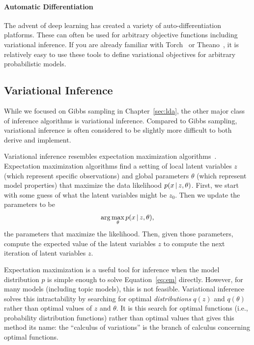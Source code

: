 \paragraph{Automatic Differentiation}

The advent of deep learning has created a variety of
auto-differentiation platforms.  These can often be used for arbitrary
objective functions including variational inference.  If you are
already familiar with Torch~\citep{collobert-11} or Theano~\citep{theano}, it is relatively easy to use
these tools to define variational objectives for arbitrary
probabilistic models.

\subsection{Variational Inference}

While we focused on Gibbs sampling in Chapter~\ref{sec:lda}, the other major
class of inference algorithms is variational inference.  Compared to
Gibbs sampling, variational inference is often considered to be
slightly more difficult to both derive and implement.

Variational inference resembles expectation maximization
algorithms~\citep{liang-07b}.  Expectation maximization algorithms find a
setting of local latent variables $z$ (which represent specific observations) and global parameters $\theta$ (which represent model properties) that maximize
the data likelihood $p(x \, | \, z, \theta)$.  First, we start with some guess
of what the latent variables might be $z_0$.  Then we update the
parameters to be
\begin{equation}
  \arg \max_{\theta} p(x \, | \, z, \theta),
\label{eq:em}
\end{equation}
the parameters that maximize the likelihood.  Then, given those
parameters, compute the expected value of the latent variables $z$ to
compute the next iteration of latent variables $z$.

Expectation maximization is a useful tool for inference when the model
distribution $p$ is simple enough to solve Equation~\ref{eq:em}
directly.  However, for many models (including topic models), this is
not feasible.  Variational inference solves this intractability by
searching for optimal {\em distributions} $q(z)$ and $q(\theta)$ rather than optimal values of $z$ and $\theta$.
It is this search for optimal functions (i.e., probability distribution functions) rather than optimal values that gives this method its name: the ``calculus of variations'' is the branch of calculus concerning optimal functions.

